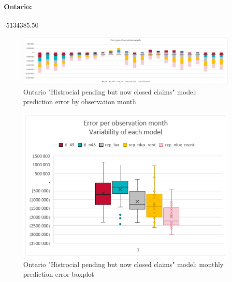 	\paragraph{Ontario:}
		-5134385.50
		\begin{figure}[H]
			\begin{center}
				\includegraphics[scale=0.2]{Graphiques/ON_closedonly_model_by_month} 
				\renewcommand{\figurename}{Figure}
				\caption{Ontario "Histrocial pending but now closed claims" model: prediction error by observation month}\label{Fig_ON_closedonly_er_by_month}
			\end{center}
		\end{figure}
		\begin{figure}[H]
			\begin{center}
				\includegraphics[scale=0.2]{Graphiques/ON_closedonly_model_mustach} 
				\renewcommand{\figurename}{Figure}
				\caption{Ontario "Histrocial pending but now closed claims" model: monthly prediction error boxplot}\label{Fig_ON_closedonly_er_boxplot}
			\end{center}
		\end{figure}
	
